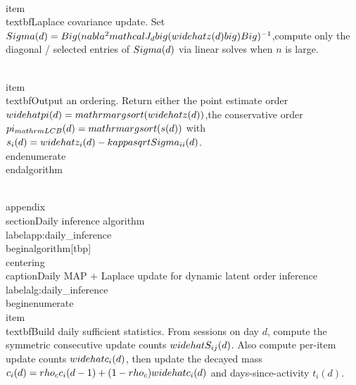 \documentclass[11pt]{article}
\begin{document}
\\item \\textbf{Laplace covariance update.}
Set $\\Sigma(d)=\\Big(\\nabla^2\\mathcal J_d\\big(\\widehat z(d)\\big)\\Big)^{-1}$,\nor compute only the diagonal / selected entries of $\\Sigma(d)$ via linear solves when $n$ is large.

\\item \\textbf{Output an ordering.}
Return either the point estimate order $\\widehat\\pi(d)=\\mathrm{argsort}(\\widehat z(d))$,\nor the conservative order $\\pi_{\\mathrm{LCB}}(d)=\\mathrm{argsort}(s(d))$ with\n$s_i(d)=\\widehat z_i(d)-\\kappa\\sqrt{\\Sigma_{ii}(d)}$.
\\end{enumerate}
\\end{algorithm}

\\appendix
\\section{Daily inference algorithm}
\\label{app:daily_inference}
\\begin{algorithm}[tbp]
\\centering
\\caption{Daily MAP + Laplace update for dynamic latent order inference}
\\label{alg:daily_inference}
\\begin{enumerate}
\\item \\textbf{Build daily sufficient statistics.}
From sessions on day $d$, compute the symmetric consecutive update counts $\\widehat S_{ij}(d)$.
Also compute per-item update counts $\\widehat c_i(d)$, then update the decayed mass
$c_i(d)=\\rho_c c_i(d-1)+(1-\\rho_c)\\widehat c_i(d)$ and days-since-activity $t_i(d)$.
\end{document}
